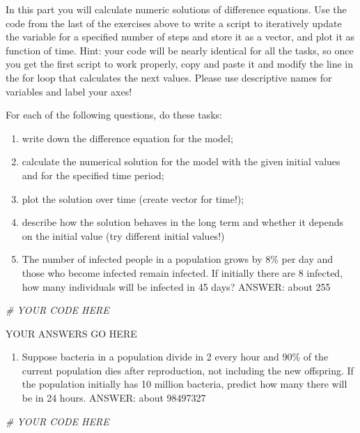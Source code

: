 \documentclass[
]{book}
\newenvironment{Shaded}{\begin{snugshade}}{\end{snugshade}}
\newcommand{\CommentTok}[1]{\textcolor[rgb]{0.56,0.35,0.01}{\textit{#1}}}
\providecommand{\tightlist}{%
  \setlength{\itemsep}{0pt}\setlength{\parskip}{0pt}}
\theoremstyle{definition}
\theoremstyle{definition}
\theoremstyle{definition}
\theoremstyle{remark}
\begin{document}
In this part you will calculate numeric solutions of difference equations. Use the code from the last of the exercises above to write a script to iteratively update the variable for a specified number of steps and store it as a vector, and plot it as function of time. Hint: your code will be nearly identical for all the tasks, so once you get the first script to work properly, copy and paste it and modify the line in the for loop that calculates the next values. Please use descriptive names for variables and label your axes!

For each of the following questions, do these tasks:

\begin{enumerate}
\def\labelenumi{\arabic{enumi}.}
\item
  write down the difference equation for the model;
\item
  calculate the numerical solution for the model with the given initial values and for the specified time period;
\item
  plot the solution over time (create vector for time!);
\item
  describe how the solution behaves in the long term and whether it depends on the initial value (try different initial values!)
\item
  The number of infected people in a population grows by 8\% per day and those who become infected remain infected. If initially there are 8 infected, how many individuals will be infected in 45 days? ANSWER: about 255
\end{enumerate}

\begin{Shaded}
\begin{Highlighting}[]
\CommentTok{\# YOUR CODE HERE}
\end{Highlighting}
\end{Shaded}

YOUR ANSWERS GO HERE

\begin{enumerate}
\def\labelenumi{\arabic{enumi}.}
\setcounter{enumi}{1}
\tightlist
\item
  Suppose bacteria in a population divide in 2 every hour and 90\% of the current population dies after reproduction, not including the new offspring. If the population initially has 10 million bacteria, predict how many there will be in 24 hours. ANSWER: about 98497327
\end{enumerate}

\begin{Shaded}
\begin{Highlighting}[]
\CommentTok{\# YOUR CODE HERE}
\end{Highlighting}
\end{Shaded}
\end{document}
